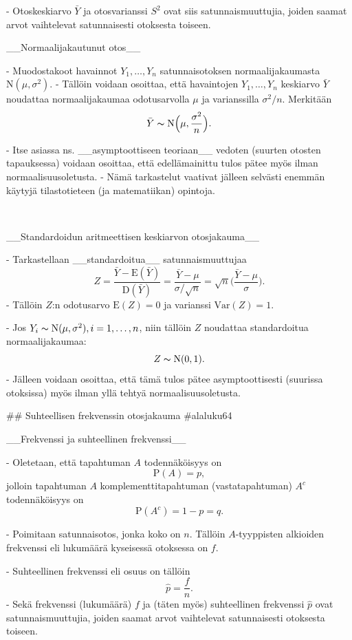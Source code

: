 \documentclass[
]{book}
\begin{document}
\begin{itemize}
- Otoskeskiarvo $\bar{Y}$ ja otosvarianssi $S^2$ ovat siis satunnaismuuttujia, joiden saamat arvot vaihtelevat satunnaisesti otoksesta toiseen.

__Normaalijakautunut otos__

- Muodostakoot havainnot $Y_1, \ldots, Y_n$ satunnaisotoksen normaalijakaumasta $\text{N}(\mu, \sigma^2)$.
- Tällöin voidaan osoittaa, että havaintojen $Y_1, \ldots, Y_n$ keskiarvo $\bar{Y}$ noudattaa normaalijakaumaa odotusarvolla $\mu$ ja varianssilla $\sigma^2/n$. Merkitään
$$
\bar{Y} \thicksim \text{N} \Big(\mu, \frac{\sigma^2}{n} \Big).
$$

- Itse asiassa ns. __asymptoottiseen teoriaan__ vedoten (suurten otosten tapauksessa) voidaan osoittaa, että edellämainittu tulos pätee myös ilman normaalisuusoletusta. 
    - Nämä tarkastelut vaativat jälleen selvästi enemmän käytyjä tilastotieteen (ja matematiikan) opintoja.

\
\
\
\

__Standardoidun aritmeettisen keskiarvon otosjakauma__

- Tarkastellaan __standardoitua__ satunnaismuuttujaa
$$
Z = \frac{\bar{Y} - \text{E}(\bar{Y})}{\text{D}(\bar{Y})} = \frac{\bar{Y} - \mu}{\sigma / \sqrt{n}} = \sqrt{n} \Big(\frac{\bar{Y} - \mu}{\sigma}\Big).
$$
  - Tällöin $Z$:n odotusarvo $\text{E}(Z) = 0$ ja varianssi $\mathrm{Var}(Z) = 1$.

- Jos $Y_i \thicksim \text{N}(\mu, \sigma^2), i=1,\ldots,n$, niin tällöin $Z$ noudattaa standardoitua normaalijakaumaa: 
$$
Z \thicksim \text{N}(0,1).
$$
  - Jälleen voidaan osoittaa, että tämä tulos pätee asymptoottisesti (suurissa otoksissa) myös ilman yllä tehtyä normaalisuusoletusta.

## Suhteellisen frekvenssin otosjakauma {#alaluku64}

__Frekvenssi ja suhteellinen frekvenssi__

- Oletetaan, että tapahtuman $A$ todennäköisyys on
$$
\text{P}(A) = p,
$$
jolloin tapahtuman $A$ komplementtitapahtuman (vastatapahtuman) $A^c$ todennäköisyys on
$$
\text{P}(A^c) = 1- p = q.
$$

- Poimitaan satunnaisotos, jonka koko on $n$. Tällöin $A$-tyyppisten alkioiden frekvenssi eli lukumäärä kyseisessä otoksessa on $f$. 

- Suhteellinen frekvenssi eli osuus on tällöin
$$
\widehat{p} = \frac{f}{n}.
$$
- Sekä frekvenssi (lukumäärä) $f$ ja (täten myös) suhteellinen frekvenssi $\widehat{p}$ ovat satunnaismuuttujia, joiden saamat arvot vaihtelevat satunnaisesti otoksesta toiseen.


\end{itemize}
\end{document}
